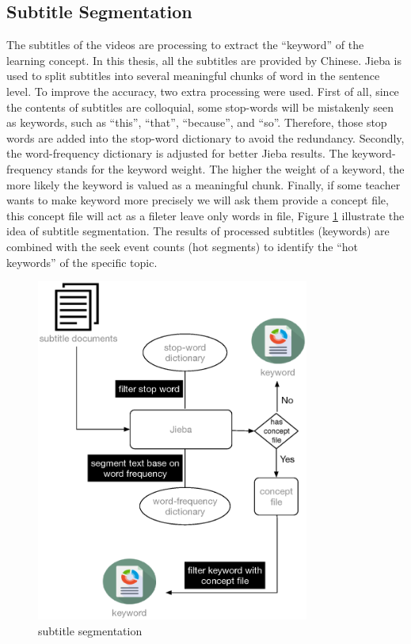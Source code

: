 \subsection{Subtitle Segmentation}
The subtitles of the videos are processing to extract the ``keyword'' of the learning concept. In this thesis, all the subtitles are provided by Chinese. Jieba is used to split subtitles into several meaningful chunks of word in the sentence level.
To improve the accuracy, two extra processing were used. First of all, since the contents of subtitles are colloquial, some stop-words will be mistakenly seen as keywords, such as ``this'', ``that'', ``because'', and ``so''. Therefore, those stop words are added into the stop-word dictionary to avoid the redundancy. Secondly, the word-frequency dictionary is adjusted for better Jieba results. The keyword-frequency stands for the keyword weight. The higher the weight of a keyword, the more likely the keyword is valued as a meaningful chunk.
Finally, if some teacher wants to make keyword more precisely we will ask them provide a concept file, this concept file will act as a fileter leave only words in file, Figure \ref{fig:subtitleseg} illustrate the idea of subtitle segmentation.
The results of processed subtitles (keywords) are combined with the seek event counts (hot segments) to identify the “hot keywords” of the specific topic.

\begin{figure}[H]
    \centering
    \includegraphics[width = 0.8\textwidth]{fig/subtitleseg.eps}
    \caption{subtitle segmentation}
    \label{fig:subtitleseg}
\end{figure}

